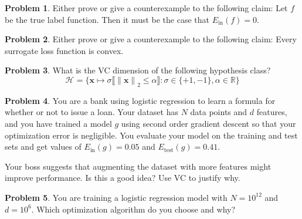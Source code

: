 \documentclass[10pt]{exam}
\theoremstyle{definition}
\newtheorem{problem}{Problem}
\newcommand{\R}{\mathbb R}
\newcommand{\x}{\mathbf x}
\newcommand{\ltwo}[1]{{\lVert {#1} \rVert}_2}
\newcommand{\Ein}{E_{\text{in}}}
\newcommand{\Etest}{E_{\text{test}}}
\newcommand{\dvc}{{d_{\text{VC}}}}
\newcommand{\HH}[1]{\mathcal H_{\text{#1}}}
\begin{document}
\newpage
\begin{problem}
Either prove or give a counterexample to the following claim: 
Let $f$ be the true label function.
Then it must be the case that $\Ein(f)=0$.
\end{problem}
\begin{solution}
\end{solution}

\newpage
\begin{problem}
Either prove or give a counterexample to the following claim: 
Every surrogate loss function is convex.
\end{problem}
\begin{solution}
\end{solution}

\newpage
\begin{problem}
What is the VC dimension of the following hypothesis class?
\begin{equation}
    \HH{} = \bigg\{ \x \mapsto \sigma\big\llbracket \ltwo{\x} \le \alpha \big\rrbracket : \sigma\in\{+1,-1\}, \alpha \in \R \bigg\}
\end{equation}
\end{problem}
\begin{solution}
\end{solution}

\newpage
\begin{problem}
    You are a bank using logistic regression to learn a formula for whether or not to issue a loan.
    Your dataset has $N$ data points and $d$ features,
    and you have trained a model $g$ using second order gradient descent so that your optimization error is negligible.
    You evaluate your model on the training and test sets and get values of $\Ein(g)=0.05$ and $\Etest(g)=0.41$.

    Your boss suggests that augmenting the dataset with more features might improve performance.
    Is this a good idea?  Use VC to justify why.
\end{problem}
\begin{solution}
\end{solution}

\newpage
\begin{problem}
You are training a logistic regression model with $N=10^{12}$ and $d=10^6$.
Which optimization algorithm do you choose and why?
\end{problem}
\begin{solution}
\end{solution}
\end{document}
